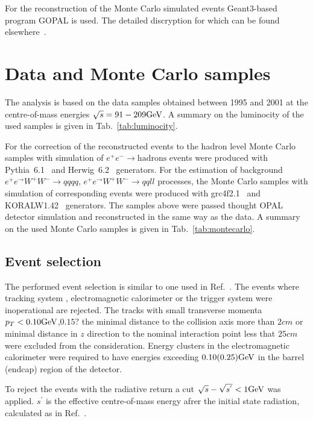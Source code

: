 For the reconstruction of the Monte Carlo simulated events Geant3-based~\cite{Brun:1987ma} program GOPAL
is used. The detailed discryption for which can be found elsewhere~\cite{Allison:1991bf}.

\section{Data and Monte Carlo samples}
\label{sec:selection}
The analysis is based on the data samples obtained between 1995 and 2001 
at the centre-of-mass energies $\sqrt{s}=91-209{\text{Ge}\kern-0.06667em\text{V\/}}$. A summary on the luminocity
of the used samples is given in Tab.~\ref{tab:luminocity}.



For the correction of the reconstructed events to the hadron level 
Monte Carlo samples with simulation of $e^+e^-\rightarrow \text{hadrons}$ events were produced with Pythia~6.1~\cite{Sjostrand:2000wi} and 
 Herwig~6.2~\cite{Corcella:2000bw} generators.
For the estimation of background   $e^+e^\rightarrow W^+W^-\rightarrow qqqq$, $e^+e^\rightarrow W^+W^-\rightarrow qqll$ processes,
 the Monte Carlo samples with simulation of corresponding events were produced with grc4f2.1~\cite{Fujimoto:1996wj} and  KORALW1.42~\cite{Skrzypek:1995wd} generators.
The samples above were passed thought OPAL detector simulation and reconstructed
in the same way as the data.
A summary on  the used Monte Carlo samples is given in Tab.~\ref{tab:montecarlo}.
\TABmontecarlo


\subsection{Event selection}
\label{sec:selection}
The performed event selection is similar to one used in Ref.~\cite{Abbiendi:2004qz}.
The events where tracking system , electromagnetic calorimeter or the trigger system were inoperational are rejected.
The tracks with small transverse momenta $p_{T}<0.10{\text{Ge}\kern-0.06667em\text{V\/}}$,{\bf $0.15?$} the minimal  distance to the 
collision axis more than $2cm$ or minimal distance in $z$ direction to the nominal interaction point less that $25cm$
were excluded from the consideration. 
Energy clusters in the electromagnetic calorimeter were required to have energies exceeding $0.10(0.25) {\text{Ge}\kern-0.06667em\text{V\/}}$ in 
the barrel (endcap) region of the detector.

To reject the events with  the radiative return a cut $\sqrt{s}-\sqrt{s^{'}}<1{\text{Ge}\kern-0.06667em\text{V\/}}$ was applied. 
${s}^{'}$ is the effective centre-of-mass energy afrer the initial state radiation, calculated as in Ref.~\cite{Abbiendi:2003dh}.

